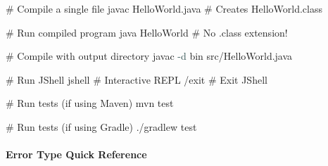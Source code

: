 \documentclass[
  justified,
  openright,
]{tufte-book}
\let\subsubsection\paragraph
\let\paragraph\paragraph
\newcommand{\AttributeTok}[1]{\textcolor{DarkSlateGray}{#1}}
\newcommand{\CommentTok}[1]{\textcolor{MidGray}{#1}}
\newcommand{\ExtensionTok}[1]{#1}
\newcommand{\NormalTok}[1]{#1}
\newenvironment{Shaded}{%
  \begin{snugshade}
}{%
  \end{snugshade}
}
\let\subsubsection\paragraph
\let\paragraph\paragraph
\begin{document}
\begin{Shaded}
\begin{Highlighting}[]
\CommentTok{\# Compile a single file}
\ExtensionTok{javac}\NormalTok{ HelloWorld.java    }\CommentTok{\# Creates HelloWorld.class}

\CommentTok{\# Run compiled program}
\ExtensionTok{java}\NormalTok{ HelloWorld          }\CommentTok{\# No .class extension!}

\CommentTok{\# Compile with output directory}
\ExtensionTok{javac} \AttributeTok{{-}d}\NormalTok{ bin src/HelloWorld.java}

\CommentTok{\# Run JShell}
\ExtensionTok{jshell}                   \CommentTok{\# Interactive REPL}
\ExtensionTok{/exit}                    \CommentTok{\# Exit JShell}

\CommentTok{\# Run tests (if using Maven)}
\ExtensionTok{mvn}\NormalTok{ test}

\CommentTok{\# Run tests (if using Gradle)}
\ExtensionTok{./gradlew}\NormalTok{ test}
\end{Highlighting}
\end{Shaded}

\subsubsection{Error Type Quick
Reference}\label{error-type-quick-reference}
\end{document}
